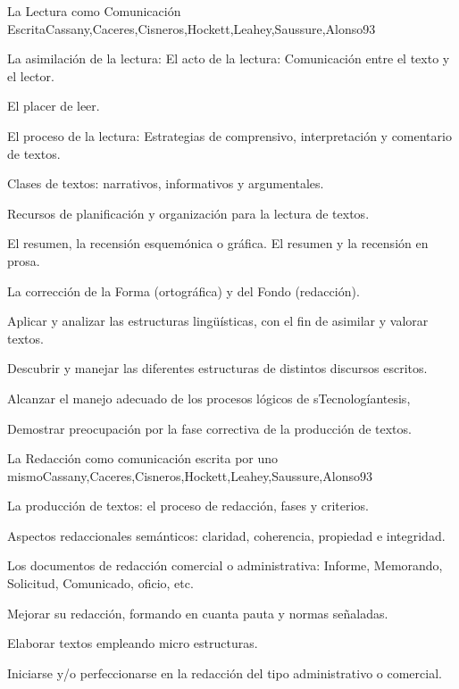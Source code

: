 \begin{syllabus}
\begin{unit}{La Lectura como Comunicación Escrita}{Cassany,Caceres,Cisneros,Hockett,Leahey,Saussure,Alonso}{9}{3}
\begin{topics}
   \item La asimilación de la lectura: El acto de la lectura: Comunicación entre el texto y el lector. 
   \item El placer de leer.  
   \item El proceso de la lectura: Estrategias de comprensivo, interpretación y comentario de textos.
   \item Clases de textos: narrativos, informativos y argumentales. 
   \item Recursos de planificación y organización para la lectura de textos.
   \item El resumen, la recensión esquemónica o gráfica. El resumen y la recensión en prosa.
   \item La corrección de la Forma (ortográfica) y del Fondo (redacción).
\end{topics}
\begin{learningoutcomes}
   \item Aplicar y analizar las estructuras lingüísticas, con el fin de asimilar y valorar textos.
   \item Descubrir y manejar las diferentes estructuras de distintos discursos escritos.
   \item Alcanzar el manejo adecuado de los procesos lógicos de sTecnologíantesis,
   \item Demostrar preocupación por la fase correctiva de la producción de textos.
\end{learningoutcomes}
\end{unit}

\begin{unit}{La Redacción como comunicación escrita por uno mismo}{Cassany,Caceres,Cisneros,Hockett,Leahey,Saussure,Alonso}{9}{3}
\begin{topics}
   \item La producción de textos: el proceso de redacción, fases y criterios.
   \item Aspectos redaccionales semánticos: claridad, coherencia, propiedad e integridad.
   \item Los documentos de redacción comercial o administrativa: Informe, Memorando, Solicitud, Comunicado, oficio, etc.
\end{topics}
\begin{learningoutcomes}
   \item Mejorar su redacción, formando en cuanta pauta y normas señaladas.
   \item Elaborar textos empleando micro estructuras.
   \item Iniciarse y/o perfeccionarse en la redacción del tipo administrativo o comercial.
\end{learningoutcomes}
\end{unit}


\end{syllabus}
